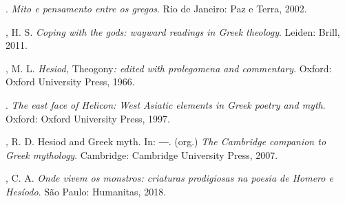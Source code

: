 \begin{bibliohedra}
\titidem. \emph{Mito e pensamento entre os gregos}. Rio de Janeiro: Paz e
Terra, 2002.

, H. S. \emph{Coping with the gods: wayward readings in Greek
theology}. Leiden: Brill, 2011.

, M. L. \emph{Hesiod,} Theogony\emph{: edited with prolegomena and
commentary}. Oxford: Oxford University Press, 1966.

\titidem. \emph{The east face of Helicon: West Asiatic elements in Greek poetry
and myth}. Oxford: Oxford University Press, 1997.

, R. D. Hesiod and Greek myth. In: ―. (org.) \emph{The Cambridge
companion to Greek mythology}. Cambridge: Cambridge University Press,
2007.

, C. A. \emph{Onde vivem os monstros: criaturas prodigiosas na
poesia de Homero e Hesíodo}. São Paulo: Humanitas, 2018.
\end{bibliohedra}


